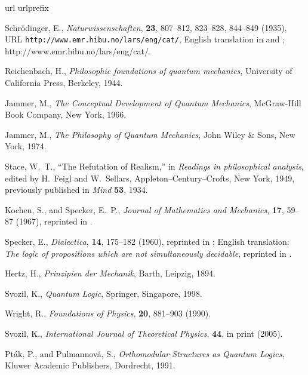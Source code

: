 \documentclass{aipproc}
\begin{document}
\begin{thebibliography}{10}
\providecommand{\enquote}[1]{``#1''}
\expandafter\ifx\csname url\endcsname\relax
  \def\url#1{\texttt{#1}}\fi
\expandafter\ifx\csname urlprefix\endcsname\relax\def\urlprefix{URL }\fi

Schr{\"{o}}dinger, E., \emph{Naturwissenschaften}, \textbf{23}, 807--812,
  823--828, 844--849 (1935),
  \urlprefix\url{http://www.emr.hibu.no/lars/eng/cat/}, {E}nglish translation
  in \cite{trimmer} and \cite[pp. 152-167]{wheeler-Zurek:83};
  http://www.emr.hibu.no/lars/eng/cat/.

Reichenbach, H., \emph{Philosophic foundations of quantum mechanics},
  University of California Press, Berkeley, 1944.

Jammer, M., \emph{The Conceptual Development of Quantum Mechanics}, McGraw-Hill
  Book Company, New York, 1966.

Jammer, M., \emph{The Philosophy of Quantum Mechanics}, John Wiley \& Sons, New
  York, 1974.

Stace, W.~T., \enquote{The Refutation of Realism,} in \emph{Readings in
  philosophical analysis}, edited by H.~Feigl and W.~Sellars,
  Appleton--Century--Crofts, New York, 1949, previously published in {\em Mind}
  {\bf 53}, 1934.

Kochen, S., and Specker, E.~P., \emph{Journal of Mathematics and Mechanics},
  \textbf{17}, 59--87 (1967), reprinted in \cite[pp. 235--263]{specker-ges}.

Specker, E., \emph{Dialectica}, \textbf{14}, 175--182 (1960), reprinted in
  \cite[pp. 175--182]{specker-ges}; {E}nglish translation: {\it The logic of
  propositions which are not simultaneously decidable}, reprinted in \cite[pp.
  135-140]{hooker}.

Hertz, H., \emph{{P}rinzipien der {M}echanik}, Barth, Leipzig, 1894.

Svozil, K., \emph{Quantum Logic}, Springer, Singapore, 1998.

Wright, R., \emph{Foundations of Physics}, \textbf{20}, 881--903 (1990).

Svozil, K., \emph{International Journal of Theoretical Physics}, \textbf{44},
  in print (2005).

Pt{\'{a}}k, P., and Pulmannov{\'{a}}, S., \emph{Orthomodular Structures as
  Quantum Logics}, Kluwer Academic Publishers, Dordrecht, 1991.


\end{thebibliography}
\end{document}
